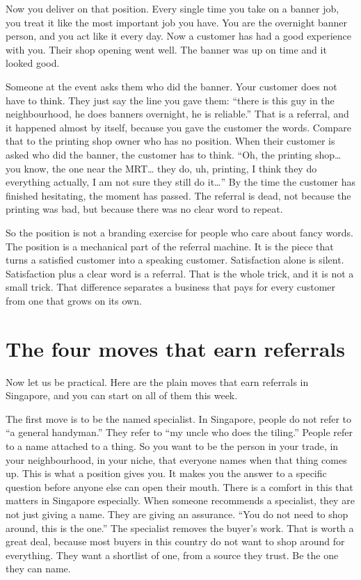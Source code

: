 \documentclass[10pt,twoside,openany]{memoir}
\newcommand{\needspacehead}{\needspace{4\baselineskip}}
\let\oldsection\section
\renewcommand{\section}{\needspacehead\oldsection}
\begin{document}
{Now you deliver on that position. Every single time you take on a banner
job, you treat it like the most important job you have. You are the
overnight banner person, and you act like it every day. Now a customer
has had a good experience with you. Their shop opening went well. The
banner was up on time and it looked good.

Someone at the event asks them who did the banner. Your customer does
not have to think. They just say the line you gave them: ``there is this
guy in the neighbourhood, he does banners overnight, he is reliable.''
That is a referral, and it happened almost by itself, because you gave
the customer the words. Compare that to the printing shop owner who has
no position. When their customer is asked who did the banner, the
customer has to think. ``Oh, the printing shop\ldots{} you know, the one
near the MRT\ldots{} they do, uh, printing, I think they do everything
actually, I am not sure they still do it\ldots{}'' By the time the
customer has finished hesitating, the moment has passed. The referral is
dead, not because the printing was bad, but because there was no clear
word to repeat.

So the position is not a branding exercise for people who care about
fancy words. The position is a mechanical part of the referral machine.
It is the piece that turns a satisfied customer into a speaking
customer. Satisfaction alone is silent. Satisfaction plus a clear word
is a referral. That is the whole trick, and it is not a small trick.
That difference separates a business that pays for every customer from
one that grows on its own.

\section{The four moves that earn
referrals}\label{the-four-moves-that-earn-referrals}

Now let us be practical. Here are the plain moves that earn referrals in
Singapore, and you can start on all of them this week.

The first move is to be the named specialist. In Singapore, people do
not refer to ``a general handyman.'' They refer to ``my uncle who does
the tiling.'' People refer to a name attached to a thing. So you want to
be the person in your trade, in your neighbourhood, in your niche, that
everyone names when that thing comes up. This is what a position gives
you. It makes you the answer to a specific question before anyone else
can open their mouth. There is a comfort in this that matters in
Singapore especially. When someone recommends a specialist, they are not
just giving a name. They are giving an assurance. ``You do not need to
shop around, this is the one.'' The specialist removes the buyer's work.
That is worth a great deal, because most buyers in this country do not
want to shop around for everything. They want a shortlist of one, from a
source they trust. Be the one they can name.

}
\end{document}
